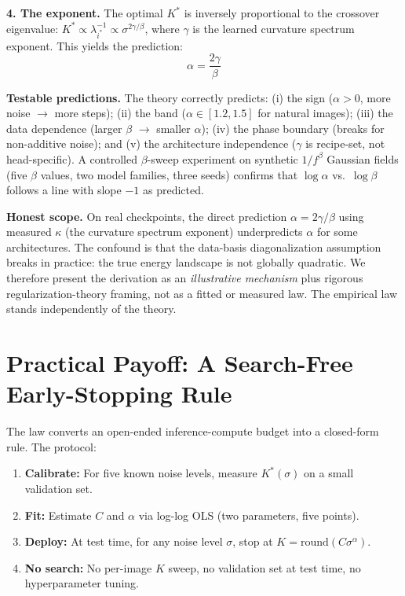 \documentclass[letterpaper]{article}
\begin{document}
\textbf{4. The exponent.} The optimal $K^*$ is inversely proportional to the crossover eigenvalue: $K^* \propto \lambda_{i^*}^{-1} \propto \sigma^{2\gamma/\beta}$, where $\gamma$ is the learned curvature spectrum exponent. This yields the prediction:
\begin{equation}
\alpha = \frac{2\gamma}{\beta}
\end{equation}

\textbf{Testable predictions.} The theory correctly predicts: (i) the sign ($\alpha > 0$, more noise $\rightarrow$ more steps); (ii) the band ($\alpha \in [1.2, 1.5]$ for natural images); (iii) the data dependence (larger $\beta$ $\rightarrow$ smaller $\alpha$); (iv) the phase boundary (breaks for non-additive noise); and (v) the architecture independence ($\gamma$ is recipe-set, not head-specific). A controlled $\beta$-sweep experiment on synthetic $1/f^\beta$ Gaussian fields (five $\beta$ values, two model families, three seeds) confirms that $\log\alpha$ vs.~$\log\beta$ follows a line with slope $-1$ as predicted.

\textbf{Honest scope.} On real checkpoints, the direct prediction $\alpha = 2\gamma/\beta$ using measured $\kappa$ (the curvature spectrum exponent) underpredicts $\alpha$ for some architectures. The confound is that the data-basis diagonalization assumption breaks in practice: the true energy landscape is not globally quadratic. We therefore present the derivation as an \emph{illustrative mechanism} plus rigorous regularization-theory framing, not as a fitted or measured law. The empirical law stands independently of the theory.

\section{Practical Payoff: A Search-Free Early-Stopping Rule}
\label{sec:protocol}

The law converts an open-ended inference-compute budget into a closed-form rule. The protocol:

\begin{enumerate}[leftmargin=*,topsep=2pt,itemsep=1pt]
\item \textbf{Calibrate:} For five known noise levels, measure $K^*(\sigma)$ on a small validation set.
\item \textbf{Fit:} Estimate $C$ and $\alpha$ via log-log OLS (two parameters, five points).
\item \textbf{Deploy:} At test time, for any noise level $\sigma$, stop at $K = \mathrm{round}(C\sigma^\alpha)$.
\item \textbf{No search:} No per-image $K$ sweep, no validation set at test time, no hyperparameter tuning.
\end{enumerate}
\end{document}
